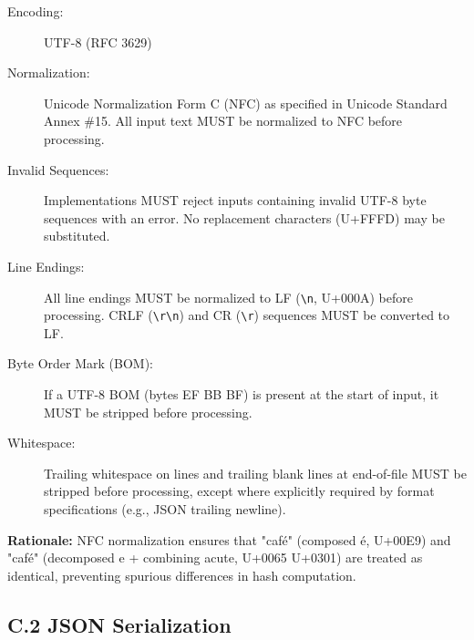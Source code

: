 \documentclass[11pt,a4paper]{article}
\begin{document}
\begin{description}
\item[Encoding:] UTF-8 (RFC 3629)

\item[Normalization:] Unicode Normalization Form C (NFC) as specified in Unicode Standard Annex \#15. All input text MUST be normalized to NFC before processing.

\item[Invalid Sequences:] Implementations MUST reject inputs containing invalid UTF-8 byte sequences with an error. No replacement characters (U+FFFD) may be substituted.

\item[Line Endings:] All line endings MUST be normalized to LF (\texttt{\textbackslash n}, U+000A) before processing. CRLF (\texttt{\textbackslash r\textbackslash n}) and CR (\texttt{\textbackslash r}) sequences MUST be converted to LF.

\item[Byte Order Mark (BOM):] If a UTF-8 BOM (bytes EF BB BF) is present at the start of input, it MUST be stripped before processing.

\item[Whitespace:] Trailing whitespace on lines and trailing blank lines at end-of-file MUST be stripped before processing, except where explicitly required by format specifications (e.g., JSON trailing newline).
\end{description}

\textbf{Rationale:} NFC normalization ensures that "café" (composed é, U+00E9) and "café" (decomposed e + combining acute, U+0065 U+0301) are treated as identical, preventing spurious differences in hash computation.

\subsection*{C.2 JSON Serialization}
\end{document}
